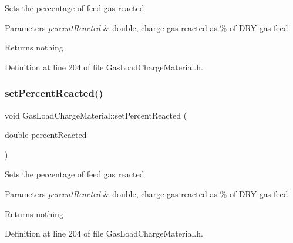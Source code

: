Sets the percentage of feed gas reacted


\begin{DoxyParams}{Parameters}
{\em percent\+Reacted} & double, charge gas reacted as \% of D\+RY gas feed\\
\hline
\end{DoxyParams}
\begin{DoxyReturn}{Returns}
nothing 
\end{DoxyReturn}


Definition at line 204 of file Gas\+Load\+Charge\+Material.\+h.

\mbox{\label{class_gas_load_charge_material_a7142cb6bbfba53d640dd6f1590fe32f6}} 
\subsubsection{\texorpdfstring{set\+Percent\+Reacted()}{setPercentReacted()}\hspace{0.1cm}{\footnotesize\ttfamily [3/3]}}
{\footnotesize\ttfamily void Gas\+Load\+Charge\+Material\+::set\+Percent\+Reacted (\begin{DoxyParamCaption}\item[{double}]{percent\+Reacted }\end{DoxyParamCaption})\hspace{0.3cm}{\ttfamily [inline]}}

Sets the percentage of feed gas reacted


\begin{DoxyParams}{Parameters}
{\em percent\+Reacted} & double, charge gas reacted as \% of D\+RY gas feed\\
\hline
\end{DoxyParams}
\begin{DoxyReturn}{Returns}
nothing 
\end{DoxyReturn}


Definition at line 204 of file Gas\+Load\+Charge\+Material.\+h.

\mbox{\label{class_gas_load_charge_material_acace81e16ef531acb0a68462ab0ed25d}} 
